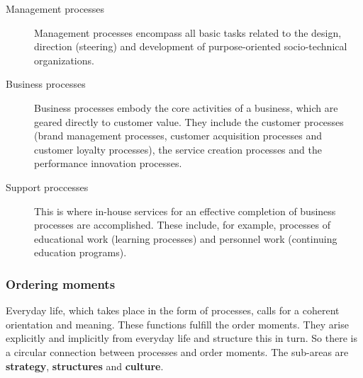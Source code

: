 \begin{description}
	\item[Management processes] Management processes encompass all basic tasks related to the design, direction (steering) and development of purpose-oriented socio-technical organizations.
	\item[Business processes] Business processes embody the core activities of a business, which are geared directly to customer value. They include the customer processes (brand management processes, customer acquisition processes and customer loyalty processes), the service creation processes and the performance innovation processes.
	\item[Support proccesses] This is where in-house services for an effective completion of business processes are accomplished. These include, for example, processes of educational work (learning processes) and personnel work (continuing education programs).
\end{description}

\subsubsection{Ordering moments}
Everyday life, which takes place in the form of processes, calls for a coherent orientation and meaning. These functions fulfill the order moments. They arise explicitly and implicitly from everyday life and structure this in turn. So there is a circular connection between processes and order moments. The sub-areas are \textbf{strategy}, \textbf{structures} and \textbf{culture}. 

